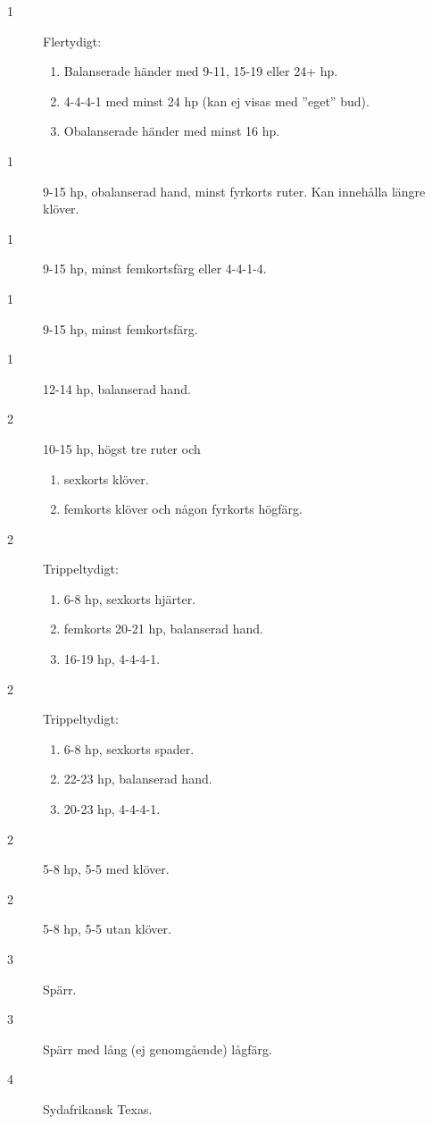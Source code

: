 

\begin{description}
   \item[1\kl] Flertydigt:
     \begin{enumerate}
       \item Balanserade h\"ander med 9-11, 15-19 eller 24+ hp.
       \item 4-4-4-1 med minst 24 hp (kan ej visas med ''eget'' bud).
       \item Obalanserade h\"ander med minst 16 hp.
     \end{enumerate}

   \item[1\ru] 9-15 hp, obalanserad hand, minst fyrkorts ruter. Kan
               inneh{\aa}lla l\"angre kl\"over.
   \item[1\hj] 9-15 hp, minst femkortsf\"arg eller 4-4-1-4.
   \item[1\spa] 9-15 hp, minst femkortsf\"arg.
   \item[1\NT] 12-14 hp, balanserad hand.

   \item[2\kl] 10-15 hp, h\"ogst tre ruter och
     \begin{enumerate}
       \item sexkorts kl\"over.
       \item femkorts kl\"over och n{\aa}gon fyrkorts h\"ogf\"arg.
     \end{enumerate}

   \item[2\ru] Trippeltydigt:
     \begin{enumerate}
       \item 6-8 hp, sexkorts hj\"arter.
       \item femkorts 20-21 hp, balanserad hand.
       \item 16-19 hp, 4-4-4-1.
     \end{enumerate}

   \item[2\hj] Trippeltydigt:
     \begin{enumerate}
      \item 6-8 hp, sexkorts spader.
      \item 22-23 hp, balanserad hand.
      \item 20-23 hp, 4-4-4-1.
     \end{enumerate}

   \item[2\spa] 5-8 hp, 5-5 med kl\"over.
   \item[2\NT] 5-8 hp, 5-5 utan kl\"over.
   \item[3\kl\ru\hj\spa] Sp\"arr.
   \item[3\NT] Sp\"arr med l{\aa}ng (ej genomg{\aa}ende) l{\aa}gf\"arg.
   \item[4\kl\ru] Sydafrikansk Texas.
\end{description}
